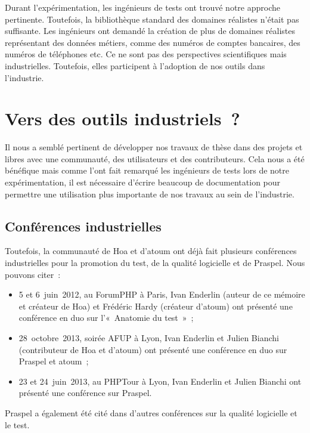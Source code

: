 Durant l'expérimentation, les ingénieurs de tests ont trouvé notre approche
pertinente. Toutefois, la bibliothèque standard des domaines réalistes n'était
pas suffisante. Les ingénieurs ont demandé la création de plus de domaines
réalistes représentant des données métiers, comme des numéros de comptes
bancaires, des numéros de téléphones etc. Ce ne sont pas des perspectives
scientifiques mais industrielles. Toutefois, elles participent à l'adoption de
nos outils dans l'industrie.

\section{Vers des outils industriels~?}

Il nous a semblé pertinent de développer nos travaux de thèse dans des projets
 et libres avec une communauté, des utilisateurs et des
contributeurs. Cela nous a été bénéfique mais comme l'ont fait remarqué les
ingénieurs de tests lors de notre expérimentation, il est nécessaire d'écrire
beaucoup de documentation pour permettre une utilisation plus importante de nos
travaux au sein de l'industrie.

\subsection{Conférences industrielles}

Toutefois, la communauté de Hoa et d'atoum ont déjà fait plusieurs conférences
industrielles pour la promotion du test, de la qualité logicielle et de Praspel.
Nous pouvons citer~:
%
\begin{itemize}

\item 5 et 6~juin~2012, au ForumPHP à Paris, Ivan Enderlin (auteur de ce mémoire
et créateur de Hoa) et Frédéric Hardy (créateur d'atoum) ont présenté une
conférence en duo sur l'«~Anatomie du test~»~;

\item 28~octobre~2013, soirée AFUP à Lyon, Ivan Enderlin et Julien Bianchi
(contributeur de Hoa et d'atoum) ont présenté une conférence en duo sur Praspel
et atoum~;

\item 23 et 24~juin~2013, au PHPTour à Lyon, Ivan Enderlin et Julien Bianchi ont
présenté une conférence sur Praspel.

\end{itemize}
%
Praspel a également été cité dans d'autres conférences sur la qualité logicielle
et le test.

